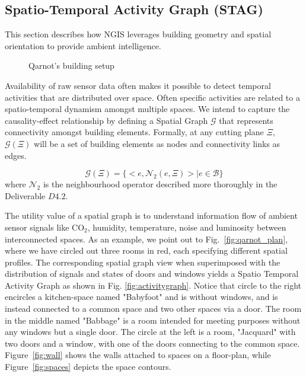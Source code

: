 \subsection{Spatio-Temporal Activity Graph (STAG)}
This section describes how NGIS leverages building geometry and spatial orientation to provide ambient intelligence.
\begin{figure}[t!]
\centering
{}\hfill
{}
\caption{Qarnot's building setup}
\end{figure} 
 Availability of raw sensor data often makes it possible to detect temporal activities that are distributed over space. Often specific activities are related to a spatio-temporal dynamism amongst multiple spaces. We intend to capture the causality-effect relationship by defining a
{Spatial Graph $\mathcal{G}$ } that represents connectivity amongst building elements. Formally, at any cutting plane $\Xi$, $\mathcal{G}( \Xi)$ will be a set of building elements as nodes and connectivity links as edges.

$$  \mathcal{G}( \Xi) =\{  <e, \mathcal{N}_2(e, \Xi) > | e \in \mathcal{B}\} $$
where $\mathcal{N}_2$ is the neighbourhood operator described more thoroughly in the Deliverable $D4.2$. 
 

The utility value of a spatial graph is to understand information flow of ambient sensor signals like CO$_2$, humidity, temperature, noise and luminosity between interconnected spaces. As an example, we point out to Fig.~\ref{fig:qarnot_plan}, where we have circled out three rooms in red, each specifying different spatial profiles.  The corresponding spatial graph view when superimposed with the distribution of signals and states of doors and windows yields a Spatio Temporal Activity Graph as shown in Fig. \ref{fig:activitygraph}.  Notice that  circle to the right encircles a kitchen-space named "Babyfoot" and is without windows, and is instead connected to a common space and two other spaces via a door.  The room in the middle named "Babbage" is a room intended for meeting purposes without any windows but a single door. The circle at the left is a room, "Jacquard" with two doors and a window, with one of the doors connecting to the common space. Figure~\ref{fig:wall} shows the walls attached to spaces on a floor-plan, while Figure~\ref{fig:spaces} depicts the space contours.
 


